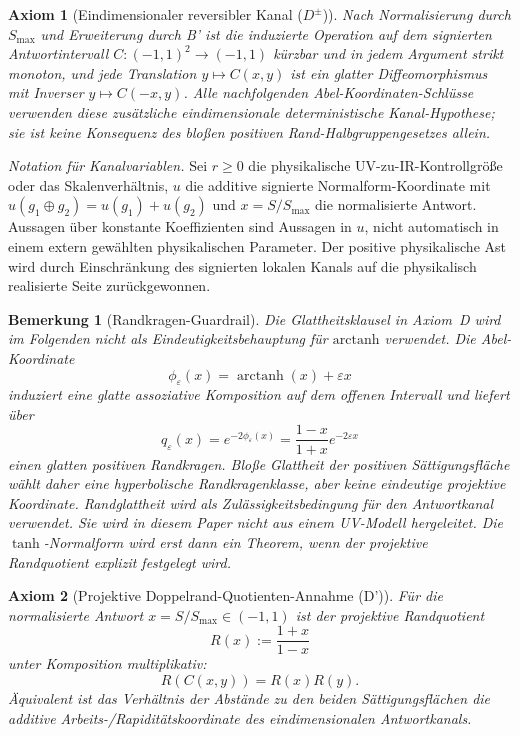 \documentclass[aps,prd,twocolumn,superscriptaddress,nofootinbib]{revtex4-2}
\newtheorem{remark}{Bemerkung}
\newtheorem{axiom}{Axiom}
\begin{document}
\begin{axiom}[Eindimensionaler reversibler Kanal ($D^\pm$)]
\label{ax:reversible_channel}
Nach Normalisierung durch $S_{\max}$ und Erweiterung durch B' ist die induzierte Operation auf dem signierten Antwortintervall $C:(-1,1)^2\to(-1,1)$ kürzbar und in jedem Argument strikt monoton, und jede Translation $y\mapsto C(x,y)$ ist ein glatter Diffeomorphismus mit Inverser $y\mapsto C(-x,y)$. Alle nachfolgenden Abel-Koordinaten-Schlüsse verwenden diese zusätzliche eindimensionale deterministische Kanal-Hypothese; sie ist keine Konsequenz des bloßen positiven Rand-Halbgruppengesetzes allein.
\end{axiom}

\textit{Notation für Kanalvariablen.} Sei $r\geq0$ die physikalische UV-zu-IR-Kontrollgröße oder das Skalenverhältnis, $u$ die additive signierte Normalform-Koordinate mit $u(g_1\oplus g_2)=u(g_1)+u(g_2)$ und $x=S/S_{\max}$ die normalisierte Antwort. Aussagen über konstante Koeffizienten sind Aussagen in $u$, nicht automatisch in einem extern gewählten physikalischen Parameter. Der positive physikalische Ast wird durch Einschränkung des signierten lokalen Kanals auf die physikalisch realisierte Seite zurückgewonnen.

\begin{remark}[Randkragen-Guardrail]
Die Glattheitsklausel in Axiom~D wird im Folgenden nicht als Eindeutigkeitsbehauptung für $\mathrm{arctanh}$ verwendet. Die Abel-Koordinate
\[
  \phi_\varepsilon(x)=\operatorname{arctanh}(x)+\varepsilon x
\]
induziert eine glatte assoziative Komposition auf dem offenen Intervall und liefert über
\[
  q_\varepsilon(x)=e^{-2\phi_\varepsilon(x)}
  =\frac{1-x}{1+x}e^{-2\varepsilon x}
\]
einen glatten positiven Randkragen. Bloße Glattheit der positiven Sättigungsfläche wählt daher eine hyperbolische Randkragenklasse, aber keine eindeutige projektive Koordinate. Randglattheit wird als Zulässigkeitsbedingung für den Antwortkanal verwendet. Sie wird in diesem Paper nicht aus einem UV-Modell hergeleitet. Die $\tanh$-Normalform wird erst dann ein Theorem, wenn der projektive Randquotient explizit festgelegt wird.
\end{remark}

\begin{axiom}[Projektive Doppelrand-Quotienten-Annahme (D')]
\label{ax:projective_quotient}
Für die normalisierte Antwort $x=S/S_{\max}\in(-1,1)$ ist der projektive Randquotient
\[
  R(x):=\frac{1+x}{1-x}
\]
unter Komposition multiplikativ:
\begin{equation}
  R(C(x,y))=R(x)R(y).
  \label{eq:projective_quotient}
\end{equation}
Äquivalent ist das Verhältnis der Abstände zu den beiden Sättigungsflächen die additive Arbeits-/Rapiditätskoordinate des eindimensionalen Antwortkanals.
\end{axiom}
\end{document}
